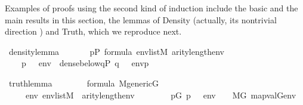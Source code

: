 Examples of proofs  using the second kind of induction include
the basic  and the main
results in this section, the lemmas of  Density  (actually, its nontrivial
direction
)
and Truth, 
which we reproduce next.
%
\begin{isabelle}
\isamarkupfalse%
\ density{\isacharunderscore}lemma{\isacharcolon}\isanewline
\ \ \isanewline
\ \ \ \ {\isachardoublequoteopen}p{\isasymin}P{\isachardoublequoteclose}\ {\isachardoublequoteopen}{\isasymphi}{\isasymin}formula{\isachardoublequoteclose}\ {\isachardoublequoteopen}env{\isasymin}list{\isacharparenleft}M{\isacharparenright}{\isachardoublequoteclose}\ {\isachardoublequoteopen}arity{\isacharparenleft}{\isasymphi}{\isacharparenright}{\isasymle}length{\isacharparenleft}env{\isacharparenright}{\isachardoublequoteclose}\isanewline
\ \ \isanewline
\ \ \ \ {\isachardoublequoteopen}{\isacharparenleft}p\ {\isasymtturnstile}\ {\isasymphi}\ env{\isacharparenright}\ {\isasymlongleftrightarrow}\ dense{\isacharunderscore}below{\isacharparenleft}{\isacharbraceleft}q{\isasymin}P{\isachardot}\ {\isacharparenleft}q\ {\isasymtturnstile}\ {\isasymphi}\ env{\isacharparenright}{\isacharbraceright}{\isacharcomma}p{\isacharparenright}{\isachardoublequoteclose}
\end{isabelle}
\begin{isabelle}
\isamarkupfalse%
\ truth{\isacharunderscore}lemma{\isacharcolon}\isanewline
\ \ \ \isanewline
\ \ \ \ {\isachardoublequoteopen}{\isasymphi}{\isasymin}formula{\isachardoublequoteclose}\ {\isachardoublequoteopen}M{\isacharunderscore}generic{\isacharparenleft}G{\isacharparenright}{\isachardoublequoteclose}\isanewline
\ \ \ \isanewline
\ \ \ \ \ {\isachardoublequoteopen}{\isasymAnd}env{\isachardot}\ env{\isasymin}list{\isacharparenleft}M{\isacharparenright}\ {\isasymLongrightarrow}\ arity{\isacharparenleft}{\isasymphi}{\isacharparenright}{\isasymle}length{\isacharparenleft}env{\isacharparenright}\ {\isasymLongrightarrow}\ \isanewline
\ \ \ \ \ \ {\isacharparenleft}{\isasymexists}p{\isasymin}G{\isachardot}\ {\isacharparenleft}p\ {\isasymtturnstile}\ {\isasymphi}\ env{\isacharparenright}{\isacharparenright}\ \ {\isasymlongleftrightarrow}\ \ M{\isacharbrackleft}G{\isacharbrackright}{\isacharcomma}\ map{\isacharparenleft}val{\isacharparenleft}G{\isacharparenright}{\isacharcomma}env{\isacharparenright}\ {\isasymTurnstile}\ {\isasymphi}{\isachardoublequoteclose}
\end{isabelle}
